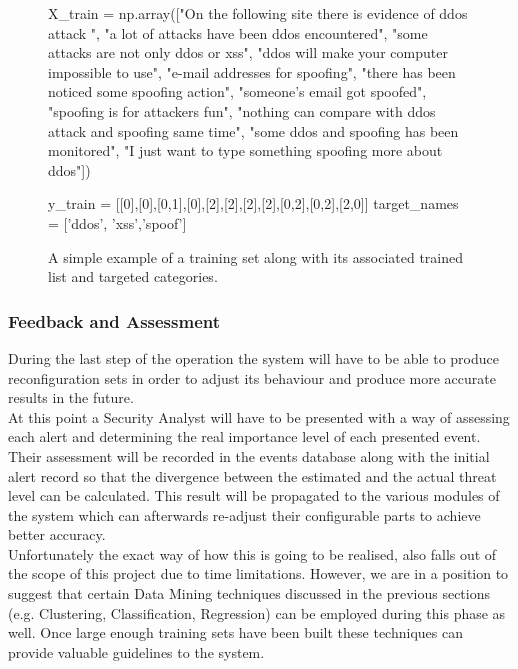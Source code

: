 \documentclass[12pt]{article}
\begin{document}
\newpage
\begin{figure}[h!]
\begin{footnotesize}
\begin{spverbatim}
X_train = np.array(["On the following site there is evidence of ddos attack ",
                    "a lot of attacks have been ddos encountered",
                    "some attacks are not only ddos or xss",
                    "ddos will make your computer impossible to use",
                    "e-mail addresses for spoofing",
                    "there has been noticed some spoofing action",
                    "someone's email got spoofed",
                    "spoofing is for attackers fun",
                    "nothing can compare with ddos attack and spoofing same time",
                    "some ddos and spoofing has been monitored",
                    "I just want to type something spoofing more about ddos"])

y_train = [[0],[0],[0,1],[0],[2],[2],[2],[2],[0,2],[0,2],[2,0]]
target_names = ['ddos', 'xss','spoof']
\end{spverbatim}
\end{footnotesize}
\captionsetup{font=small}
\caption{A simple example of a training set along with its associated trained list and targeted categories.}
\label{fig:trainset}
\end{figure}

\newpage
\subsubsection{Feedback and Assessment}
During the last step of the operation the system will have to be able to produce reconfiguration sets in order to adjust its behaviour and produce more accurate results in the future.
\hfill \break\\
At this point a Security Analyst will have to be presented with a way of assessing each alert and  determining the real importance level of each presented event.
\hfill \break\\
Their assessment will be recorded in the events database along with the initial alert record so that the divergence between the estimated and the actual threat level can be calculated. This result will be propagated to the various modules of the system which can afterwards re-adjust their configurable parts to achieve better accuracy.
\hfill \break\\
Unfortunately the exact way of how this is going to be realised, also falls out of the scope of this project due to time limitations. However, we are in a position to suggest that certain Data Mining techniques discussed in the previous sections (e.g. Clustering, Classification, Regression) can be employed during this phase as well. Once large enough training sets have been built these techniques can provide valuable guidelines to the system. 
\end{document}
